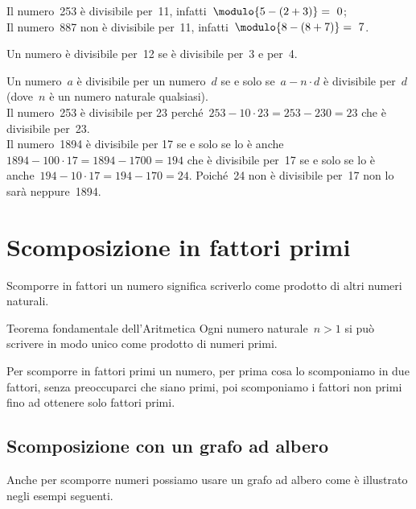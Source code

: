 \begin{description} [noitemsep]
Il numero~253 è divisibile per~11, infatti~\(\modulo{5-(2+3)} =~0\);\\
Il numero~887 non è divisibile per~11, infatti~\(\modulo{8-(8+7)}=~7\).
\item[\textbf{12}:~] Un numero è divisibile per~12 se è 
divisibile 
per~3 e per~4.
\item[un numero qualunque:~] Un numero~\(a\) è divisibile 
per un numero~\(d\) se e solo se~\(a - n \cdot d\) è divisibile per~\(d\) 
(dove~\(n\) è un numero naturale qualsiasi).\\
Il numero~253 è divisibile per 23 
perché~\(253 - 10 \cdot 23 = 253 - 230 = 23\) che è divisibile per~23.\\
Il numero~1894 è divisibile per 17 se e solo se lo è 
anche~\(1894 - 100 \cdot 17 = 1894 - 1700 = 194\) 
che è divisibile per~17 se e solo se lo è
anche~\(194 - 10 \cdot 17 = 194 - 170 = 24\). 
Poiché~24 non è divisibile per~17 non lo sarà neppure~1894.
\end{description}



\section{Scomposizione in fattori primi}
\label{sec:nat_scomposizione}

Scomporre in fattori un numero significa scriverlo come prodotto di altri 
numeri naturali. 


\begin{teorema}{Teorema fondamentale dell'Aritmetica}{}
Ogni numero naturale~\(n>1\) si può scrivere in modo unico come prodotto di 
numeri primi.
\end{teorema}

Per scomporre in fattori primi un numero, per prima cosa lo scomponiamo in 
due fattori, senza preoccuparci che siano primi, poi scomponiamo i fattori
non primi fino ad ottenere solo fattori primi.

\subsection{Scomposizione con un grafo ad albero}

Anche per scomporre numeri possiamo usare un grafo ad albero come è 
illustrato negli esempi seguenti.

